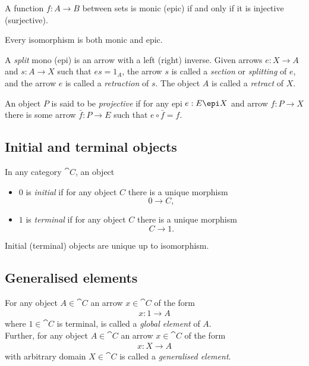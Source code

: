 \documentclass{article}
\begin{document}
\begin{proposition}
    A function $f:A\to B$ between sets is monic (epic) if and only if it is injective (surjective).
\end{proposition}

\begin{proposition}
    Every isomorphism is both monic and epic.
\end{proposition}

\begin{definition}
    A \emph{split} mono (epi) is an arrow with a left (right) inverse. Given
    arrows $e:X\to A$ and $s:A\to X$ such that $es=1_A$, the arrow $s$ is called
    a \emph{section} or \emph{splitting} of $e$, and the arrow $e$ is called a
    \emph{retraction} of $s$. The object $A$ is called a \emph{retract} of $X$.
\end{definition}

\begin{definition}
    An object $P$ is said to be \emph{projective} if for any epi $e:E\epi X$
    and arrow $f:P\to X$ there is some arrow $\bar f:P\to E$ such that
    $e\circ \bar f = f$.
\end{definition}

\subsection{Initial and terminal objects}

\begin{definition}
    In any category $\cat C$, an object
    \begin{itemize}
        \item $0$ is \emph{initial} if for any object $C$ there is a unique morphism
        \[0\to C,\]
        \item $1$ is \emph{terminal} if for any object $C$ there is a unique morphism
        \[C\to 1.\]
    \end{itemize}
\end{definition}

\begin{proposition}
    Initial (terminal) objects are unique up to isomorphism.    
\end{proposition}

\subsection{Generalised elements}

\begin{definition}
    For any object $A\in\cat C$ an arrow $x\in\cat C$ of the form
    \begin{align*}
        x: 1 \to A
    \end{align*}
    where $1\in\cat C$ is terminal, is called a \emph{global element}
    of $A$.\\
    Further, for any object $A\in\cat C$ an arrow $x\in\cat C$ of the
    form
    \begin{align*}
        x: X\to A
    \end{align*} 
    with arbitrary domain $X\in\cat C$ is called a \emph{generalised element}.
\end{definition}
\end{document}
